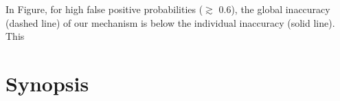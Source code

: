 In Figure, for high false positive
probabilities ($\gtrsim$ 0.6), the global inaccuracy (dashed line) of our
mechanism is below the individual inaccuracy (solid line). This 

\section{Synopsis}
\label{sec:ct-synopsis}

